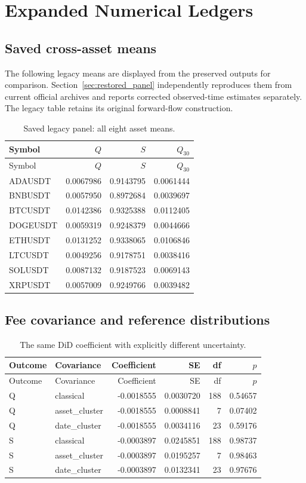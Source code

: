 \section{Expanded Numerical Ledgers}
\subsection{Saved cross-asset means}
The following legacy means are displayed from the preserved outputs for comparison. Section~\ref{sec:restored_panel} independently reproduces them from current official archives and reports corrected observed-time estimates separately. The legacy table retains its original forward-flow construction.
\begin{longtable}{lrrr}
\caption{Saved legacy panel: all eight asset means.}\\
\toprule Symbol & $Q$ & $S$ & $Q_{30}$\\\midrule\endfirsthead
\toprule Symbol & $Q$ & $S$ & $Q_{30}$\\\midrule\endhead
\bottomrule\endfoot
ADAUSDT & 0.0067986 & 0.9143795 & 0.0061444\\
BNBUSDT & 0.0057950 & 0.8972684 & 0.0039697\\
BTCUSDT & 0.0142386 & 0.9325388 & 0.0112405\\
DOGEUSDT & 0.0059319 & 0.9248379 & 0.0044666\\
ETHUSDT & 0.0131252 & 0.9338065 & 0.0106846\\
LTCUSDT & 0.0049256 & 0.9178751 & 0.0038416\\
SOLUSDT & 0.0087132 & 0.9187523 & 0.0069143\\
XRPUSDT & 0.0057009 & 0.9249766 & 0.0039482\\
\end{longtable}
\subsection{Fee covariance and reference distributions}
\begin{longtable}{llrrrr}
\caption{The same DiD coefficient with explicitly different uncertainty.}\\
\toprule Outcome & Covariance & Coefficient & SE & df & $p$\\\midrule\endfirsthead
\toprule Outcome & Covariance & Coefficient & SE & df & $p$\\\midrule\endhead
\bottomrule\endfoot
Q & classical & -0.0018555 & 0.0030720 & 188 & 0.54657\\
Q & asset\_cluster & -0.0018555 & 0.0008841 & 7 & 0.07402\\
Q & date\_cluster & -0.0018555 & 0.0034116 & 23 & 0.59176\\
S & classical & -0.0003897 & 0.0245851 & 188 & 0.98737\\
S & asset\_cluster & -0.0003897 & 0.0195257 & 7 & 0.98463\\
S & date\_cluster & -0.0003897 & 0.0132341 & 23 & 0.97676\\
\end{longtable}
